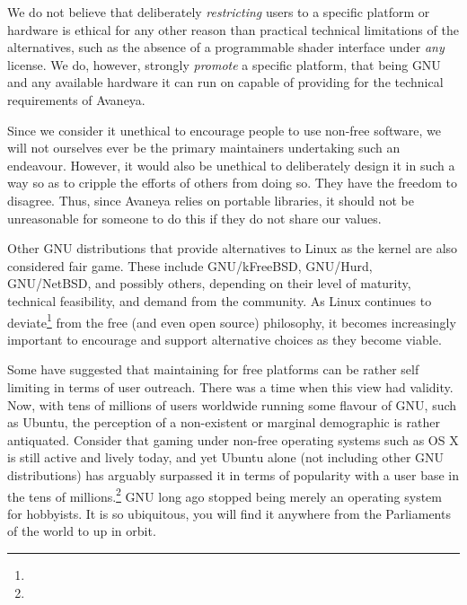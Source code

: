 We do not believe that deliberately {\it restricting} users to a specific platform or hardware is ethical for any other reason than practical technical limitations of the alternatives, such as the absence of a programmable shader interface under {\it any} license. We do, however, strongly {\it promote} a specific platform, that being GNU and any available hardware it can run on capable of providing for the technical requirements of Avaneya.

Since we consider it unethical to encourage people to use non-free software, we will not ourselves ever be the primary maintainers undertaking such an endeavour. However, it would also be unethical to deliberately design it in such a way so as to cripple the efforts of others from doing so. They have the freedom to disagree. Thus, since Avaneya relies on portable libraries, it should not be unreasonable for someone to do this if they do not share our values.

Other GNU distributions that provide alternatives to Linux as the kernel are also considered fair game. These include GNU/kFreeBSD, GNU/Hurd, GNU/NetBSD, and possibly others, depending on their level of maturity, technical feasibility, and demand from the community. As Linux continues to deviate\footnote{} from the free (and even open source) philosophy, it becomes increasingly important to encourage and support alternative choices as they become viable.

Some have suggested that maintaining for free platforms can be rather self limiting in terms of user outreach. There was a time when this view had validity. Now, with tens of millions of users worldwide running some flavour of GNU, such as Ubuntu, the perception of a non-existent or marginal demographic  is rather antiquated. Consider that gaming under non-free operating systems such as OS X is still active and lively today, and yet Ubuntu alone (not including other GNU distributions) has arguably surpassed it in terms of popularity with a user base in the tens of millions.\footnote{} GNU long ago stopped being merely an operating system for hobbyists. It is so ubiquitous, you will find it anywhere from the Parliaments of the world to up in orbit.

\StopChapter

